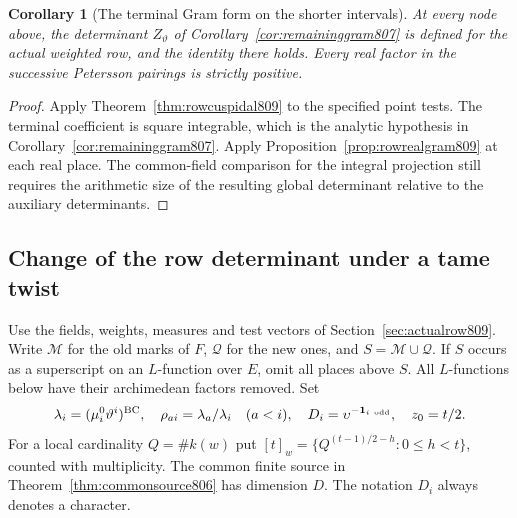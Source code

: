 \documentclass[a4paper,11pt]{article}
\newtheorem{corollary}[proposition]{Corollary}
\theoremstyle{definition}
\theoremstyle{remark}
\numberwithin{equation}{section}
\begin{document}
\begin{corollary}[The terminal Gram form on the shorter intervals]
\leavevmode\label{cor:rowdefined809}
At every node above, the determinant \(Z_\vartheta\) of
Corollary~\ref{cor:remaininggram807} is defined for the actual
weighted row, and the identity there holds. Every real factor
in the successive Petersson pairings is strictly positive.
\end{corollary}
\begin{proof}
Apply Theorem~\ref{thm:rowcuspidal809} to the specified point
tests. The terminal coefficient is square integrable, which
is the analytic hypothesis in Corollary~\ref{cor:remaininggram807}.
Apply Proposition~\ref{prop:rowrealgram809} at each real place.
The common-field comparison for the integral projection still
requires the arithmetic size of the resulting global
determinant relative to the auxiliary determinants.
\end{proof}
\clearpage

\subsection{Change of the row determinant under a tame twist}
\label{sec:relativechain810}
Use the fields, weights, measures and test vectors of
Section~\ref{sec:actualrow809}. Write \(\mathcal M\) for the old
marks of \(F\), \(\mathcal Q\) for the new ones, and
\(S=\mathcal M\cup\mathcal Q\). If \(S\) occurs as a superscript
on an \(L\)-function over \(E\), omit all places above \(S\).
All \(L\)-functions below have their archimedean factors removed.
Set
\[
 \lambda_i=(\mu_i^0\vartheta^i)^{\rm BC},\quad
 \rho_{ai}=\lambda_a/\lambda_i\quad(a<i),\quad
 D_i=\upsilon^{-{\bf1}_{i\ {\rm odd}}},\quad z_0=t/2 .
\]
For a local cardinality \(Q=\#k(w)\) put
\([t]_w=\{Q^{(t-1)/2-h}:0\le h<t\}\), counted with multiplicity.
The common finite source in Theorem~\ref{thm:commonsource806}
has dimension \(D\). The notation \(D_i\) always denotes a
character.
\end{document}
